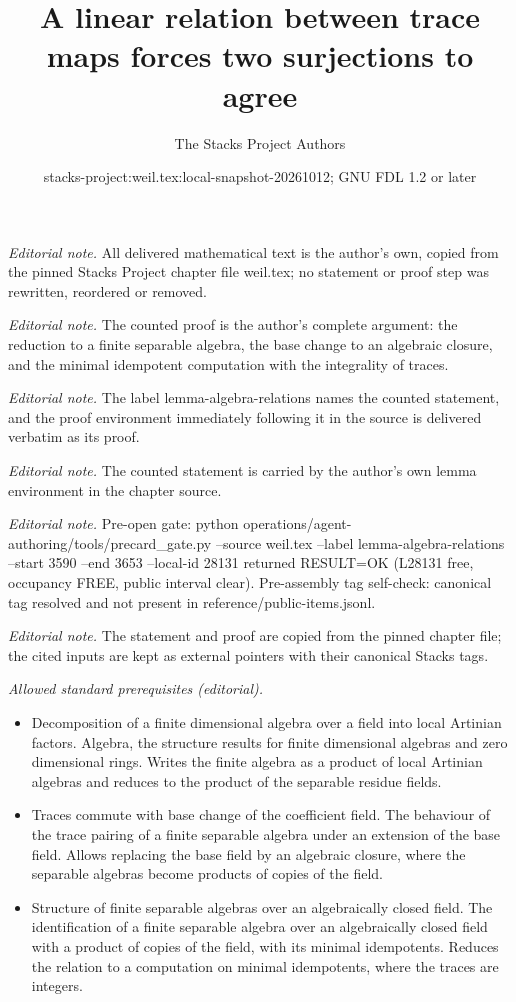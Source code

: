 \documentclass[10pt,a4paper]{amsart}
\title{A linear relation between trace maps forces two surjections to agree}
\author{The Stacks Project Authors}
\date{stacks-project:weil.tex:local-snapshot-20261012; GNU FDL 1.2 or later}
\theoremstyle{plain}
\theoremstyle{definition}
\theoremstyle{remark}
\numberwithin{equation}{subsection}
\begin{document}
\maketitle
\noindent\textit{Editorial note.} All delivered mathematical text is the author's own, copied from the pinned Stacks Project chapter file weil.tex; no statement or proof step was rewritten, reordered or removed.\par\medskip
\noindent\textit{Editorial note.} The counted proof is the author's complete argument: the reduction to a finite separable algebra, the base change to an algebraic closure, and the minimal idempotent computation with the integrality of traces.\par\medskip
\noindent\textit{Editorial note.} The label lemma-algebra-relations names the counted statement, and the proof environment immediately following it in the source is delivered verbatim as its proof.\par\medskip
\noindent\textit{Editorial note.} The counted statement is carried by the author's own lemma environment in the chapter source.\par\medskip
\noindent\textit{Editorial note.} Pre-open gate: python operations/agent-authoring/tools/precard\_gate.py --source weil.tex --label lemma-algebra-relations --start 3590 --end 3653 --local-id 28131 returned RESULT=OK (L28131 free, occupancy FREE, public interval clear). Pre-assembly tag self-check: canonical tag resolved and not present in reference/public-items.jsonl.\par\medskip
\noindent\textit{Editorial note.} The statement and proof are copied from the pinned chapter file; the cited inputs are kept as external pointers with their canonical Stacks tags.\par\medskip
\noindent\textit{Allowed standard prerequisites (editorial).}\begin{itemize}
\item Decomposition of a finite dimensional algebra over a field into local Artinian factors. Algebra, the structure results for finite dimensional algebras and zero dimensional rings. Writes the finite algebra as a product of local Artinian algebras and reduces to the product of the separable residue fields.
\item Traces commute with base change of the coefficient field. The behaviour of the trace pairing of a finite separable algebra under an extension of the base field. Allows replacing the base field by an algebraic closure, where the separable algebras become products of copies of the field.
\item Structure of finite separable algebras over an algebraically closed field. The identification of a finite separable algebra over an algebraically closed field with a product of copies of the field, with its minimal idempotents. Reduces the relation to a computation on minimal idempotents, where the traces are integers.
\end{itemize}\medskip
\end{document}
